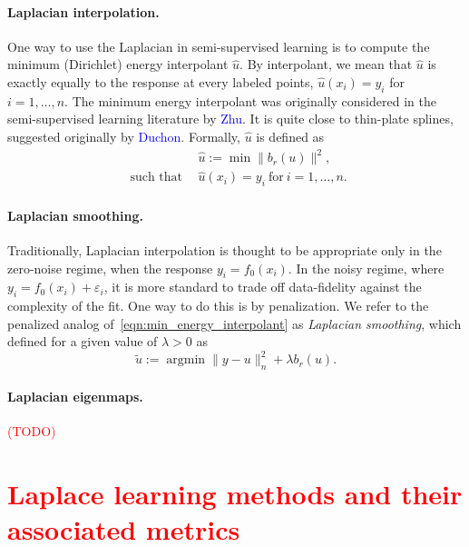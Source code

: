 \documentclass{article}
\newcommand{\1}{\mathbf{1}}
\DeclareMathOperator*{\argmin}{argmin}
\newcommand{\wt}[1]{\widetilde{#1}}
\newcommand{\wh}[1]{\widehat{#1}}
\theoremstyle{definition}
\theoremstyle{remark}
\begin{document}
\paragraph{Laplacian interpolation.}
One way to use the Laplacian in semi-supervised learning is to compute the minimum (Dirichlet) energy interpolant $\wh{u}$. By interpolant, we mean that $\wh{u}$ is exactly equally to the response at every labeled points, $\wh{u}(x_i) = y_i$ for $i = 1,\ldots,n$. The minimum energy interpolant was originally considered in the semi-supervised learning literature by \textcolor{blue}{Zhu}. It is quite close to thin-plate splines, suggested originally by \textcolor{blue}{Duchon}. Formally, $\wh{u}$ is defined as  
\begin{equation}
\label{eqn:min_energy_interpolant}
\begin{aligned}
& \wh{u} := \min \|b_r(u)\|^2, \\
~~\textrm{such that}~~ &\wh{u}(x_i) = y_i ~\textrm{for}~ i = 1,\ldots,n.
\end{aligned}
\end{equation}

\paragraph{Laplacian smoothing.}
Traditionally, Laplacian interpolation is thought to be appropriate only in the zero-noise regime, when the response $y_i = f_0(x_i)$. In the noisy regime, where $y_i = f_0(x_i) + \varepsilon_i$, it is more standard to trade off data-fidelity against the complexity of the fit. One way to do this is by penalization. We refer to the penalized analog of~\eqref{eqn:min_energy_interpolant} as \emph{Laplacian smoothing}, which defined for a given value of $\lambda > 0$ as
\begin{equation}
\label{eqn:laplacian_smoothing}
\wt{u} := \argmin \|y - u\|_n^2 + \lambda b_r(u).
\end{equation}

\paragraph{Laplacian eigenmaps.}
\textcolor{red}{(TODO)}


\section{\textcolor{red}{Laplace learning methods and their associated metrics}} 
\label{sec:analogies_and_intution}
\end{document}
